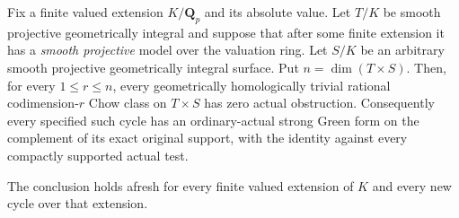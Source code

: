\begin{theorem}
\label{r20as:full-G}
Fix a finite valued extension $K/\mathbf Q_p$ and its absolute
value.  Let $T/K$ be smooth projective geometrically integral and
suppose that after some finite extension it has a \emph{smooth
projective} model over the valuation ring.  Let $S/K$ be an arbitrary
smooth projective geometrically integral surface.  Put
$n=\dim(T\times S)$.  Then, for every $1\le r\le n$, every
geometrically homologically trivial rational codimension-$r$
Chow class on $T\times S$ has zero actual obstruction.
Consequently every specified such cycle has an ordinary-actual
strong Green form on the complement of its exact original support,
with the identity against every compactly supported actual test.

The conclusion holds afresh for every finite valued extension of
$K$ and every new cycle over that extension.
\end{theorem}

